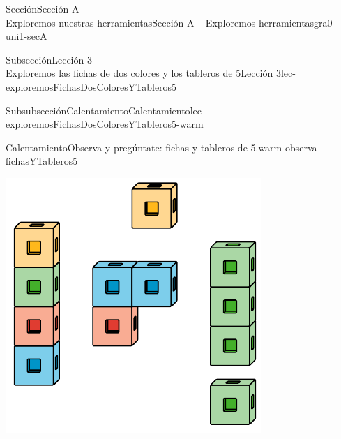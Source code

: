 \begin{sectionptx}{Sección}{{\Large Sección A\\}Exploremos nuestras herramientas}{}{Sección A -~Exploremos herramientas}{}{}{gra0-uni1-secA}
\begin{subsectionptx}{Subsección}{{\normalsize Lección 3\\[-0.05cm]}Exploremos las fichas de dos colores y los tableros de 5}{}{Lección 3}{}{}{lec-exploremosFichasDosColoresYTableros5}
\begin{subsubsectionptx}{Subsubsección}{Calentamiento}{}{Calentamiento}{}{}{lec-exploremosFichasDosColoresYTableros5-warm}
\begin{exploration}{Calentamiento}{Observa y pregúntate: fichas y tableros de 5.}{warm-observa-fichasYTableros5}
\begin{sidebyside}{2}{0.05}{0.05}{0.1}
\begin{sbspanel}{0.4}
\includegraphics[max width=\linewidth, center]{external/svg-source/tikz-file-128850.pdf}
\end{sbspanel}%
\begin{sbspanel}{0.4}%

\end{sbspanel}
\end{sidebyside}
\end{exploration}
\end{subsubsectionptx}
\end{subsectionptx}
\end{sectionptx}
